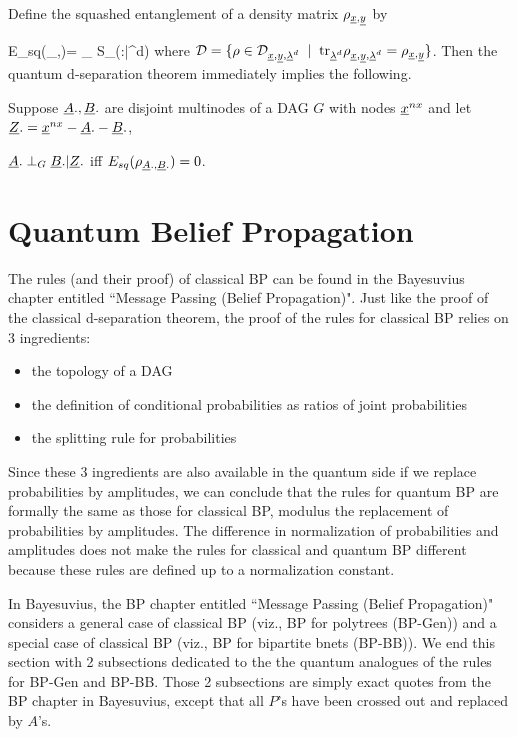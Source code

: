 \documentclass[12pt]{article}
\begin{document}
Define the squashed
entanglement
of a density
matrix $\rho_{{\underline{x}}, {\underline{y}}}$ by

\beq
E_{sq}(\rho_{\rvx,\rvy})=
\min_{\rho\in \cald}
S_\rho(\rvx:\rvy|\rvlam^d)
\eeq
where
${\cal D}=\{\rho
\in
{\cal D}_{{\underline{x}}, {\underline{y}}, {\underline{\lambda}}^d}\;\;|\;\;
{\rm tr }_{{\underline{\lambda}}^d}
\rho_{{\underline{x}},{\underline{y}}, {\underline{\lambda}}^d}
=
\rho_{{\underline{x}}, {\underline{y}}}
\}$.
Then the quantum 
d-separation
theorem immediately implies
the following.

\begin{claim}
Suppose
${\underline{A}}., {\underline{B}}.$
are disjoint multinodes
of a DAG  $G$ with nodes ${\underline{x}}^{nx}$
and let ${\underline{Z}}.={\underline{x}}^{nx}-{\underline{A}}.-{\underline{B}}.$,
 
${\underline{A}}.\perp_G {\underline{B}}.|{\underline{Z}}.$ iff
$E_{sq}(\rho_{{\underline{A}}., {\underline{B}}.})=0$.
\end{claim}


\section{Quantum Belief Propagation}

The rules
(and their proof)
of classical BP
can be found
in the Bayesuvius chapter
entitled ``Message
Passing (Belief Propagation)".
Just like
the proof
of the classical 
d-separation
theorem, 
the
proof
of the rules for classical BP
 relies on 3
ingredients:
\begin{itemize}
\item the topology
of a
DAG
\item
the definition
of conditional
probabilities 
as ratios of 
joint
probabilities
\item
the splitting rule
for probabilities
\end{itemize}
Since these
3 ingredients
are also
available
in the quantum
side
if we replace
probabilities
by amplitudes,
we can
conclude that
the rules
for quantum
BP
are formally 
the same as those
for classical BP,
modulus the
replacement of
probabilities
by
amplitudes.
The
difference in
normalization
of probabilities
and 
amplitudes
does not
make
the 
rules
for classical
and quantum
BP
different
because
these
rules
are defined up
to a normalization
constant.

In Bayesuvius, 
the BP chapter entitled ``Message Passing (Belief Propagation)"
considers a general case of classical BP (viz., BP for
polytrees (BP-Gen)) and a special case of classical
BP (viz., BP for bipartite bnets (BP-BB)).
We end this section
with 2 subsections dedicated
to the the quantum
analogues of the rules
for BP-Gen and BP-BB.
Those 2 subsections
are simply exact quotes
from the BP chapter in
Bayesuvius,
except that
all $P$'s have been
crossed out and replaced by $A$'s.
\end{document}
